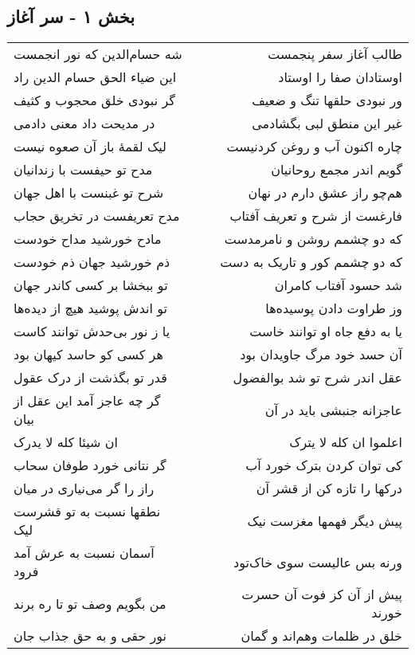 \begin{center}
\section*{بخش ۱ - سر آغاز}
\label{sec:sh001}
\begin{longtable}{l p{0.5cm} r}
شه حسام‌الدین که نور انجمست
&&
طالب آغاز سفر پنجمست
\\
این ضیاء الحق حسام الدین راد
&&
اوستادان صفا را اوستاد
\\
گر نبودی خلق محجوب و کثیف
&&
ور نبودی حلقها تنگ و ضعیف
\\
در مدیحت داد معنی دادمی
&&
غیر این منطق لبی بگشادمی
\\
لیک لقمهٔ باز آن صعوه نیست
&&
چاره اکنون آب و روغن کردنیست
\\
مدح تو حیفست با زندانیان
&&
گویم اندر مجمع روحانیان
\\
شرح تو غبنست با اهل جهان
&&
هم‌چو راز عشق دارم در نهان
\\
مدح تعریفست در تخریق حجاب
&&
فارغست از شرح و تعریف آفتاب
\\
مادح خورشید مداح خودست
&&
که دو چشمم روشن و نامرمدست
\\
ذم خورشید جهان ذم خودست
&&
که دو چشمم کور و تاریک به دست
\\
تو ببخشا بر کسی کاندر جهان
&&
شد حسود آفتاب کامران
\\
تو اندش پوشید هیچ از دیده‌ها
&&
وز طراوت دادن پوسیده‌ها
\\
یا ز نور بی‌حدش توانند کاست
&&
یا به دفع جاه او توانند خاست
\\
هر کسی کو حاسد کیهان بود
&&
آن حسد خود مرگ جاویدان بود
\\
قدر تو بگذشت از درک عقول
&&
عقل اندر شرح تو شد بوالفضول
\\
گر چه عاجز آمد این عقل از بیان
&&
عاجزانه جنبشی باید در آن
\\
ان شیئا کله لا یدرک
&&
اعلموا ان کله لا یترک
\\
گر نتانی خورد طوفان سحاب
&&
کی توان کردن بترک خورد آب
\\
راز را گر می‌نیاری در میان
&&
درکها را تازه کن از قشر آن
\\
نطقها نسبت به تو قشرست لیک
&&
پیش دیگر فهمها مغزست نیک
\\
آسمان نسبت به عرش آمد فرود
&&
ورنه بس عالیست سوی خاک‌تود
\\
من بگویم وصف تو تا ره برند
&&
پیش از آن کز فوت آن حسرت خورند
\\
نور حقی و به حق جذاب جان
&&
خلق در ظلمات وهم‌اند و گمان
\\

\end{longtable}
\end{center}
